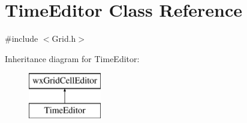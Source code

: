 \hypertarget{class_time_editor}{}\section{Time\+Editor Class Reference}
\label{class_time_editor}


{\ttfamily \#include $<$Grid.\+h$>$}

Inheritance diagram for Time\+Editor\+:\begin{figure}[H]
\begin{center}
\leavevmode
\includegraphics[height=2.000000cm]{class_time_editor}
\end{center}
\end{figure}
